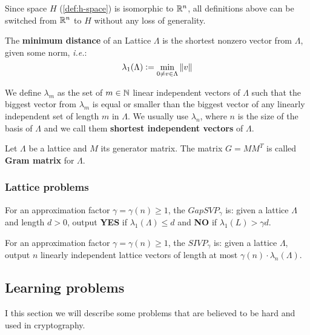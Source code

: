 \documentclass[a4paper,12pt]{article}
\begin{document}
Since space \(H\) (\ref{def:h-space}) is isomorphic to \(\mathbb{R}^n\), all definitions above can be switched from \(\mathbb{R}^n\) to \(H\) without any loss of generality.

\begin{definition}
  The \textbf{minimum distance} of an Lattice $\Lambda$ is the shortest nonzero vector
  from $\Lambda$, given some norm, \textit{i.e.}:
  $$
  \lambda_1(\Lambda) \vcentcolon = \min_{0 \ne v \in \Lambda}{\|v\|}
  $$

  We define $\lambda_m$ as the set of $m \in \mathbb{N}$  linear independent vectors of $\Lambda$
  such that the biggest vector from $\lambda_m$ is equal or smaller than the biggest vector of any linearly independent set of length $m$ in $\Lambda$. We usually use
  $\lambda_n$, where $n$ is the size of the basis of $\Lambda$ and we call them
  \textbf{shortest independent vectors} of $\Lambda$.
\end{definition}

\begin{definition}\label{def:gram-matrix}
  Let $\Lambda$ be a lattice and $M$ its generator matrix. The matrix $G = MM^T$ is called \textbf{Gram matrix} for $\Lambda$.
\end{definition}
\subsubsection{Lattice problems}
\label{sec:org651b9d8}
\begin{definition}
  \label{def:gapsvp}
For an approximation factor $\gamma  = \gamma(n) \geq 1$, the $GapSVP_\gamma $ is: given a lattice
$\Lambda$ and length $d > 0$, output \textbf{YES} if $\lambda_1(\Lambda) \leq d$ and \textbf{NO} if
$\lambda_1(L) > \gamma d$.  
\end{definition}

\begin{definition}
  \label{def:sivp}
  For an approximation factor $\gamma = \gamma(n) \geq 1$, the $SIVP_\gamma$ is: given a lattice $\Lambda$, output $n$ linearly independent lattice vectors of length at most $\gamma(n) \cdot \lambda_n(\Lambda)$.
\end{definition}

\subsection{Learning problems}
\label{sec:org61fbed5}
I this section we will describe some problems that are believed to be hard and used in cryptography. 
\end{document}
